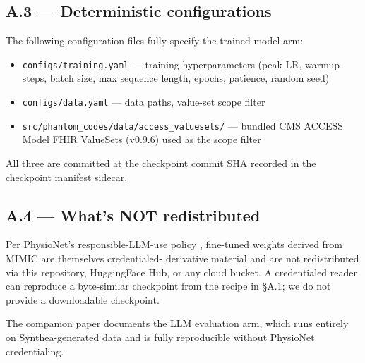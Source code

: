 \subsection{A.3 --- Deterministic configurations}\label{a.3-deterministic-configurations}

The following configuration files fully specify the trained-model
arm:

\begin{itemize}
\tightlist
\item
  \texttt{configs/training.yaml} --- training hyperparameters (peak LR,
  warmup steps, batch size, max sequence length, epochs, patience,
  random seed)
\item
  \texttt{configs/data.yaml} --- data paths, value-set scope filter
\item
  \texttt{src/phantom\_codes/data/access\_valuesets/} --- bundled CMS ACCESS
  Model FHIR ValueSets (v0.9.6) used as the scope filter
\end{itemize}

All three are committed at the checkpoint commit SHA recorded in
the checkpoint manifest sidecar.

\subsection{A.4 --- What's NOT redistributed}\label{a.4-whats-not-redistributed}

Per PhysioNet's responsible-LLM-use policy \autocite{PhysioNet2025},
fine-tuned weights derived from MIMIC are themselves credentialed-
derivative material and are not redistributed via this repository,
HuggingFace Hub, or any cloud bucket. A credentialed reader can
reproduce a byte-similar checkpoint from the recipe in §A.1; we
do not provide a downloadable checkpoint.

The companion paper \autocite{FungPhantomCodes2026} documents the LLM
evaluation arm, which runs entirely on Synthea-generated data and
is fully reproducible without PhysioNet credentialing.

